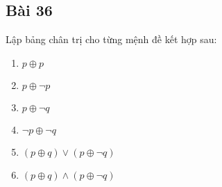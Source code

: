 \subsection*{Bài 36}
Lập bảng chân trị cho từng mệnh đề kết hợp sau:
\begin{multicols}{3}
    \begin{enumerate}[label=\alph*)]
        \item $p\oplus p$
        \item $p\oplus \neg p$
        \item $p\oplus \neg q$
        \item $\neg p\oplus \neg q$
        \item $(p\oplus q)\lor (p\oplus \neg q)$
        \item $(p\oplus q)\land (p\oplus \neg q)$
    \end{enumerate}
\end{multicols}
